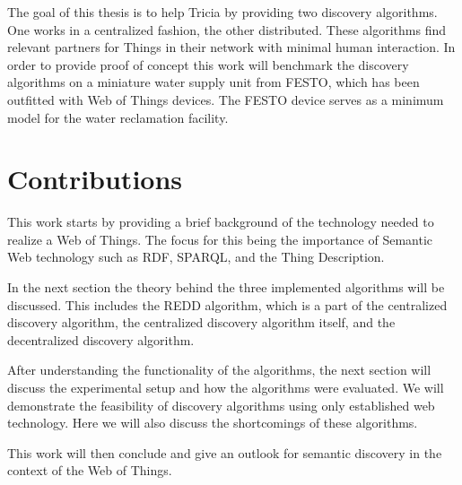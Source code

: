 The goal of this thesis is to help Tricia by providing two discovery algorithms. One works in a centralized fashion, the other distributed. These algorithms find relevant partners for Things in their network with minimal human interaction. In order to provide proof of concept this work will benchmark the discovery algorithms on a miniature water supply unit from FESTO, which has been outfitted with Web of Things devices. The FESTO device serves as a minimum model for the water reclamation facility.


\section{Contributions}
This work starts by providing a brief background of the technology needed to realize a Web of Things. The focus for this being the importance of Semantic Web technology such as RDF, SPARQL, and the Thing Description.

In the next section the theory behind the three implemented algorithms will be discussed. This includes the REDD algorithm, which is a part of the centralized discovery algorithm, the centralized discovery algorithm itself, and the decentralized discovery algorithm.

After understanding the functionality of the algorithms, the next section will discuss the experimental setup and how the algorithms were evaluated. We will demonstrate the feasibility of discovery algorithms using only established web technology. Here we will also discuss the shortcomings of these algorithms.

This work will then conclude and  give an outlook for semantic discovery in the context of the Web of Things.
